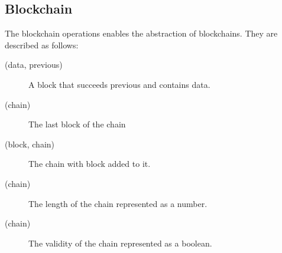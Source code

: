 \FloatBarrier

\subsection{Blockchain}

The blockchain operations enables the abstraction of blockchains.
They are described as follows:

\begin{description}
	\item[(data, previous)]
	A block that succeeds previous and contains data.
	\item[(chain)]
	The last block of the chain
	\item[(block, chain)]
	The chain with block added to it.
	\item[(chain)]
	The length of the chain represented as a number.
	\item[(chain)]
	The validity of the chain represented as a boolean.
\end{description}
